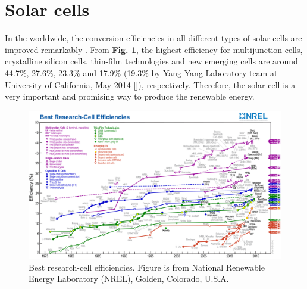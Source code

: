 \documentclass[a4paper, 12pt, titlepage,oneside,drop]{kthesis}
\begin{document}
\section{Solar cells}
In the worldwide, the conversion efficiencies in all different types of solar cells are improved remarkably \cite{nrel}. From \textbf{Fig. \ref{nrel}}, the highest efficiency for multijunction cells, crystalline silicon cells,
thin-film technologies and new emerging cells are around 44.7\%, 27.6\%, 23.3\% and 17.9\% (19.3\% by Yang Yang Laboratory team at University of California, May 2014 [\cite{zhou2014interface}]), respectively. Therefore, the solar cell is a very important and promising way to produce the
renewable energy.


\begin{figure}
\captionsetup{width=1\textwidth}
\centering
\includegraphics[scale=0.7]{efficiency_chart.jpg}
\caption{Best research-cell efficiencies. Figure is from National Renewable Energy Laboratory (NREL), Golden, Colorado, U.S.A.}
\label{nrel}
\end{figure}
\end{document}
